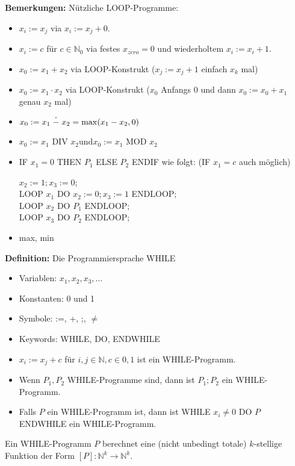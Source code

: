 \documentclass[a4paper,graphics,11pt]{article}
\newcommand{\up}[2]{\mathrel{\overset{\makebox[0pt]{\mbox{\normalfont\tiny #2}}}{#1}}}
\begin{document}
\textbf{Bemerkungen:} Nützliche LOOP-Programme:
\begin{itemize}
    \item $x_i := x_j$ via $x_i := x_j + 0$.
    \item $x_i := c$ für $c \in \mathbb{N}_0$ via festes $x_{zero} = 0$ und wiederholtem $x_i := x_i + 1$.
    \item $x_0 := x_1 + x_2$ via LOOP-Konstrukt ($x_j := x_j + 1$ einfach $x_k$ mal)
    \item $x_0 := x_1 \cdot x_2$ via LOOP-Konstrukt ($x_0$ Anfangs 0 und dann $x_0 := x_0 + x_1$ genau $x_2$ mal)
    \item $x_0 := x_1 \up{-}{\large.} x_2 = \max(x_1-x_2,0)$
    \item $x_0 := x_1 \text{ DIV } x_2$\quad und\quad $x_0 := x_1 \text{ MOD } x_2$
    \item IF $x_1 = 0$ THEN $P_1$ ELSE $P_2$ ENDIF wie folgt: (IF $x_1 = c$ auch möglich)

        $x_2 := 1; x_3 := 0$;\\
        LOOP $x_1$ DO $x_2 := 0;x_3 := 1$ ENDLOOP;\\
        LOOP $x_2$ DO $P_1$ ENDLOOP;\\
        LOOP $x_3$ DO $P_2$ ENDLOOP;\\
    \item max, min
\end{itemize}

\newpage

\textbf{Definition:} Die Programmiersprache WHILE
\begin{itemize}
    \item Variablen: $x_1,x_2,x_3,\dots$
    \item Konstanten: 0 und 1
    \item Symbole: :=, +, ;, {\color{red}$\neq$}
    \item Keywords: WHILE, DO, ENDWHILE
    \\
    \item $x_i := x_j + c$ für $i,j \in \mathbb{N}, c\in {0,1}$ ist ein WHILE-Programm.
    \item Wenn $P_1,P_2$ WHILE-Programme sind, dann ist $P_1;P_2$ ein WHILE-Programm.
    \item Falls $P$ ein WHILE-Programm ist, dann ist WHILE $x_i \neq 0$ DO $P$ ENDWHILE ein WHILE-Programm.
\end{itemize}

Ein WHILE-Programm $P$ berechnet eine (nicht unbedingt totale) $k$-stellige Funktion der Form
$[P] : \mathbb{N}^k \to \mathbb{N}^k$.
\end{document}
